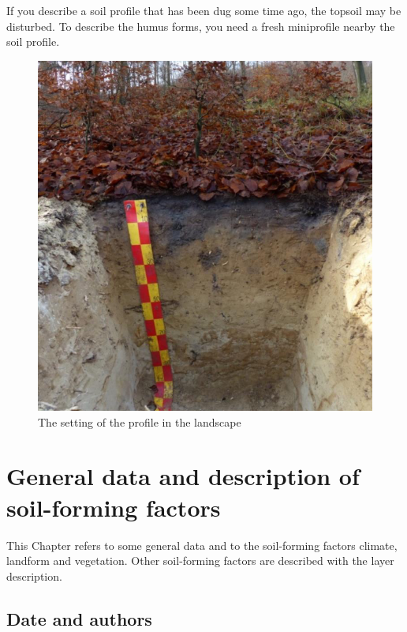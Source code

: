 \documentclass[
  letterpaper,
  DIV=11,
  numbers=noendperiod]{scrreprt}
\begin{document}
If you describe a soil profile that has been dug some time ago, the
topsoil may be disturbed. To describe the humus forms, you need a fresh
miniprofile nearby the soil profile.

\begin{figure}

{\centering \includegraphics{./figure_8-6.png}

}

\caption{The setting of the profile in the landscape}

\end{figure}

\hypertarget{general-data-and-description-of-soil-forming-factors}{%
\section{General data and description of soil-forming
factors}\label{general-data-and-description-of-soil-forming-factors}}

This Chapter refers to some general data and to the soil-forming factors
climate, landform and vegetation. Other soil-forming factors are
described with the layer description.

\hypertarget{date-and-authors}{%
\subsection{Date and authors}\label{date-and-authors}}
\end{document}
